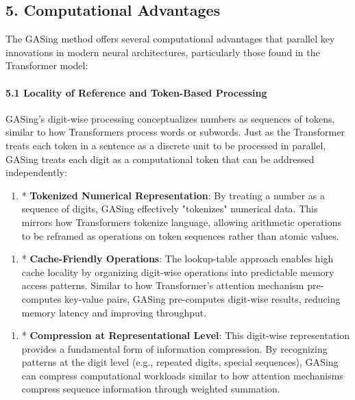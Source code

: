 \documentclass[11pt,a4paper]{article}
\begin{document}
\subsection{5. Computational Advantages}
The GASing method offers several computational advantages that parallel key innovations in modern neural architectures, particularly those found in the Transformer model:

\paragraph{5.1 Locality of Reference and Token-Based Processing}
GASing's digit-wise processing conceptualizes numbers as sequences of tokens, similar to how Transformers process words or subwords. Just as the Transformer treats each token in a sentence as a discrete unit to be processed in parallel, GASing treats each digit as a computational token that can be addressed independently:

\begin{enumerate}
  \item * \textbf{Tokenized Numerical Representation}: By treating a number as a sequence of digits, GASing effectively "tokenizes" numerical data. This mirrors how Transformers tokenize language, allowing arithmetic operations to be reframed as operations on token sequences rather than atomic values.
\end{enumerate}

\begin{enumerate}
  \item * \textbf{Cache-Friendly Operations}: The lookup-table approach enables high cache locality by organizing digit-wise operations into predictable memory access patterns. Similar to how Transformer's attention mechanism pre-computes key-value pairs, GASing pre-computes digit-wise results, reducing memory latency and improving throughput.
\end{enumerate}

\begin{enumerate}
  \item * \textbf{Compression at Representational Level}: This digit-wise representation provides a fundamental form of information compression. By recognizing patterns at the digit level (e.g., repeated digits, special sequences), GASing can compress computational workloads similar to how attention mechanisms compress sequence information through weighted summation.
\end{enumerate}
\end{document}
